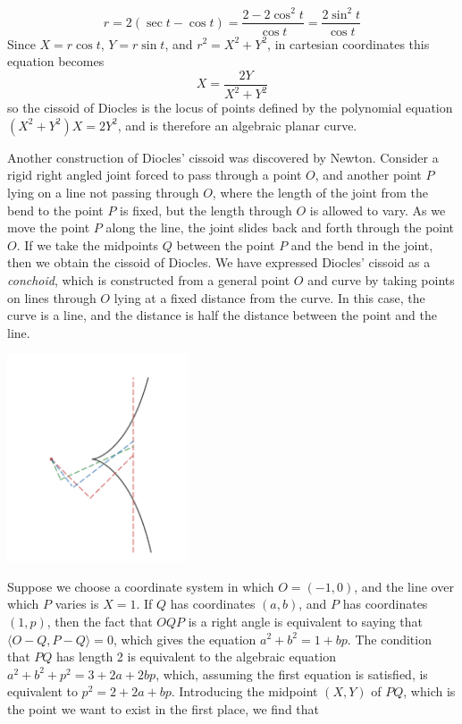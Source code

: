 \begin{example}
    \[ r = 2(\sec t - \cos t) = \frac{2 - 2\cos^2 t}{\cos t} = \frac{2 \sin^2 t}{\cos t}\]
    Since $X = r \cos t$, $Y = r \sin t$, and $r^2 = X^2 + Y^2$, in cartesian coordinates this equation becomes
    \[ X = \frac{2Y}{X^2 + Y^2} \]
    so the cissoid of Diocles is the locus of points defined by the polynomial equation $(X^2 + Y^2) X = 2Y^2$, and is therefore an algebraic planar curve.
\end{example}

\begin{example}
    Another construction of Diocles' cissoid was discovered by Newton. Consider a rigid right angled joint forced to pass through a point $O$, and another point $P$ lying on a line not passing through $O$, where the length of the joint from the bend to the point $P$ is fixed, but the length through $O$ is allowed to vary. As we move the point $P$ along the line, the joint slides back and forth through the point $O$. If we take the midpoints $Q$ between the point $P$ and the bend in the joint, then we obtain the cissoid of Diocles. We have expressed Diocles' cissoid as a \emph{conchoid}, which is constructed from a general point $O$ and curve by taking points on lines through $O$ lying at a fixed distance from the curve. In this case, the curve is a line, and the distance is half the distance between the point and the line.
%
    \begin{center}
        \includegraphics[width=0.4\textwidth]{ConchoidDiocles}
    \end{center}
%
    Suppose we choose a coordinate system in which $O = (-1,0)$, and the line over which $P$ varies is $X = 1$. If $Q$ has coordinates $(a,b)$, and $P$ has coordinates $(1,p)$, then the fact that $OQP$ is a right angle is equivalent to saying that $\langle O - Q, P - Q \rangle = 0$, which gives the equation $a^2 + b^2 = 1 + bp$. The condition that $PQ$ has length 2 is equivalent to the algebraic equation $a^2 + b^2 + p^2 = 3 + 2a + 2bp$, which, assuming the first equation is satisfied, is equivalent to $p^2 = 2 + 2a + bp$. Introducing the midpoint $(X,Y)$ of $PQ$, which is the point we want to exist in the first place, we find that

\end{example}
